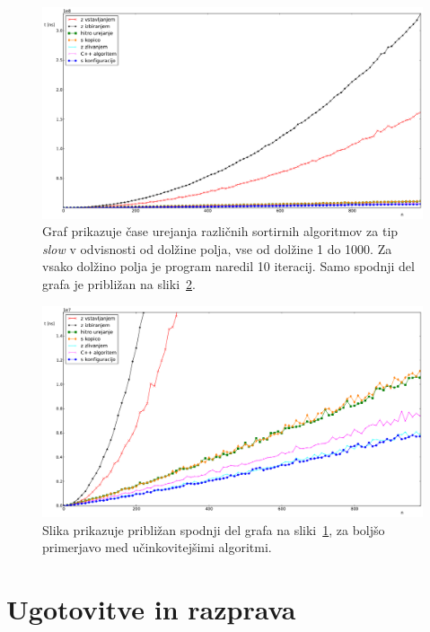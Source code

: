 \documentclass[a4paper,oneside,12pt]{article}
\begin{document}
\begin{figure}[h!]
    \includegraphics[width=\textwidth]{slike/slow1000.pdf}
    \vspace{-0.7cm}
    \caption[Rezultati za tip \emph{slow}, 1000 el.]{Graf prikazuje čase
    urejanja različnih sortirnih algoritmov za tip \emph{slow} v odvisnosti od dolžine polja, vse
    od dolžine 1 do 1000. Za vsako dolžino polja je program naredil 10 iteracij.
    Samo spodnji del grafa je približan na sliki~\ref{fig:rez:slowblizu}.}
    \label{fig:rez:slow1000}
\end{figure}

\begin{figure}[h!]
    \includegraphics[width=\textwidth]{slike/slow1000zoom.pdf}
    \vspace{-0.7cm}
    \caption[Rezultati za tip \emph{slow}, 1000 el. -- približano]{Slika
    prikazuje približan spodnji del grafa na sliki~\ref{fig:rez:slow1000}, za
    boljšo primerjavo med učinkovitejšimi algoritmi. }
    \label{fig:rez:slowblizu}
\end{figure}

\section{Ugotovitve in razprava}
\end{document}
